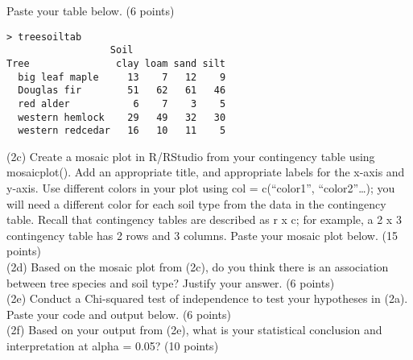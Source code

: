 \documentclass{article}
\begin{document}
Paste your table below. (6 points)
\begin{center}
\begin{lstlisting}
> treesoiltab
                  Soil
Tree               clay loam sand silt
  big leaf maple     13    7   12    9
  Douglas fir        51   62   61   46
  red alder           6    7    3    5
  western hemlock    29   49   32   30
  western redcedar   16   10   11    5
\end{lstlisting}
\end{center}


(2c) Create a mosaic plot in R/RStudio from your contingency table using mosaicplot(). Add an appropriate title, and appropriate labels for the x-axis and y-axis. Use different colors in your plot using col = c(“color1”, “color2”…); you will need a different color for each soil type from the data in the contingency table. Recall that contingency tables are described as r x c; for example, a 2 x 3 contingency table has 2 rows and 3 columns. Paste your mosaic plot below. (15 points)\\

 

(2d) Based on the mosaic plot from (2c), do you think there is an association between tree species and soil type? Justify your answer. (6 points)\\

 

(2e) Conduct a Chi-squared test of independence to test your hypotheses in (2a). Paste your code and output below. (6 points)\\

 

(2f) Based on your output from (2e), what is your statistical conclusion and interpretation at alpha = 0.05? (10 points)\\
\end{document}

